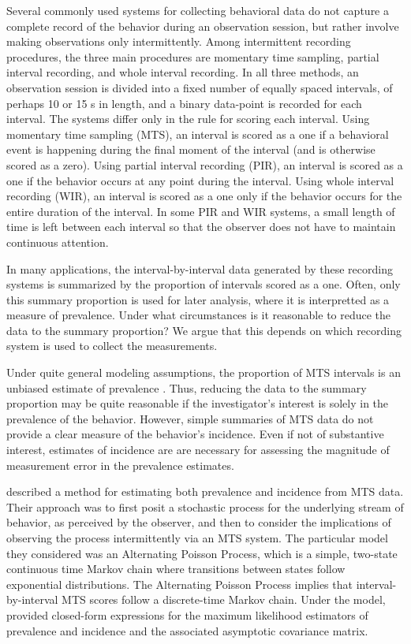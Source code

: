 \documentclass[man, noextraspace, floatsintext]{apa6}\usepackage[]{graphicx}\usepackage[]{color}
\begin{document}
Several commonly used systems for collecting behavioral data do not capture a complete record of the behavior during an observation session, but rather involve making observations only intermittently. Among intermittent recording procedures, the three main procedures are momentary time sampling, partial interval recording, and whole interval recording. In all three methods, an observation session is divided into a fixed number of equally spaced intervals, of perhaps 10 or 15 s in length, and a binary data-point is recorded for each interval. The systems differ only in the rule for scoring each interval. Using momentary time sampling (MTS), an interval is scored as a one if a behavioral event is happening during the final moment of the interval (and is otherwise scored as a zero). Using partial interval recording (PIR), an interval is scored as a one if the behavior occurs at any point during the interval. Using whole interval recording (WIR), an interval is scored as a one only if the behavior occurs for the entire duration of the interval. In some PIR and WIR systems, a small length of time is left between each interval so that the observer does not have to maintain continuous attention. 

In many applications, the interval-by-interval data generated by these recording systems is summarized by the proportion of intervals scored as a one. Often, only this summary proportion is used for later analysis, where it is interpretted as a measure of prevalence. Under what circumstances is it reasonable to reduce the data to the summary proportion? We argue that this depends on which recording system is used to collect the measurements. 

Under quite general modeling assumptions, the proportion of MTS intervals is an unbiased estimate of prevalence \citep{Rogosa1991statistical}. Thus, reducing the data to the summary proportion may be quite reasonable if the investigator's interest is solely in the prevalence of the behavior. However, simple summaries of MTS data do not provide a clear measure of the behavior's incidence. Even if not of substantive interest, estimates of incidence are  are necessary for assessing the magnitude of measurement error in the prevalence estimates. 

\citet{Brown1977estimation} described a method for estimating both prevalence and incidence from MTS data. Their approach was to first posit a stochastic process for the underlying stream of behavior, as perceived by the observer, and then to consider the implications of observing the process intermittently via an MTS system. The particular model they considered was an Alternating Poisson Process, which is a simple, two-state continuous time Markov chain where transitions between states follow exponential distributions. The Alternating Poisson Process implies that interval-by-interval MTS scores follow a discrete-time Markov chain. Under the model, \citet[see also \citealp{Griffin1983parametric}]{Brown1977estimation} provided closed-form expressions for the maximum likelihood estimators of prevalence and incidence and the associated asymptotic covariance matrix.
\end{document}
